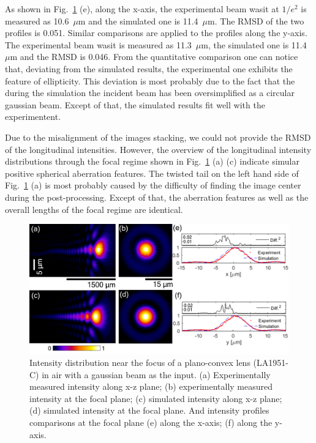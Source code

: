 \documentclass[9pt,twocolumn,twoside]{osajnl}
\begin{document}
As shown in Fig.~\ref{fig:3} (e), along the x-axis, the experimental beam wasit at $1/e^2$ is measured as 10.6~$\mu$m and the simulated one is 11.4~$\mu$m. The RMSD of the two profiles is 0.051. Similar comparisons are applied to the profiles along the y-axis. The experimental beam wasit is measured as 11.3~$\mu$m, the simulated one is 11.4~$\mu$m and the RMSD is 0.046. From the quantitative comparison one can notice that, deviating from the simulated results, the experimental one exhibits the feature of ellipticity. This deviation is most probably due to the fact that the during the simulation the incident beam has been oversimplified as a circular gaussian beam. Except of that, the simulated results fit well with the experimentent. 

Due to the misalignment of the images stacking, we could not provide the RMSD of the longitudinal intensities. However, the overview of the longitudinal intensity distributions through the focal regime shown in Fig.~\ref{fig:3} (a) (c) indicate simular positive spherical aberration features. The twisted tail on the left hand side of Fig.~\ref{fig:3} (a) is most probably caused by the difficulty of finding the image center during the post-processing. Except of that, the aberration features as well as the overall lengths of the focal regime are identical.

\begin{figure}
	\centering
	\includegraphics[width=\linewidth]{../AppOptics/figures/LA1951air.pdf}
	\caption{Intensity distribution near the focus of a plano-convex lens (LA1951-C) in air with a gaussian beam as the input. (a) Experimentally measured intensity along x-z plane; (b) experimentally measured intensity at the focal plane; (c) simulated intensity along x-z plane; (d) simulated intensity at the focal plane. And intensity profiles comparisons at the focal plane (e) along the x-axis; (f) along the y-axis.}\label{fig:3}
\end{figure}
\end{document}

